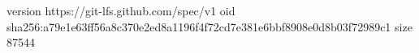 version https://git-lfs.github.com/spec/v1
oid sha256:a79e1e63ff56a8c370e2ed8a1196f4f72cd7e381e6bbf8908e0d8b03f72989c1
size 87544
